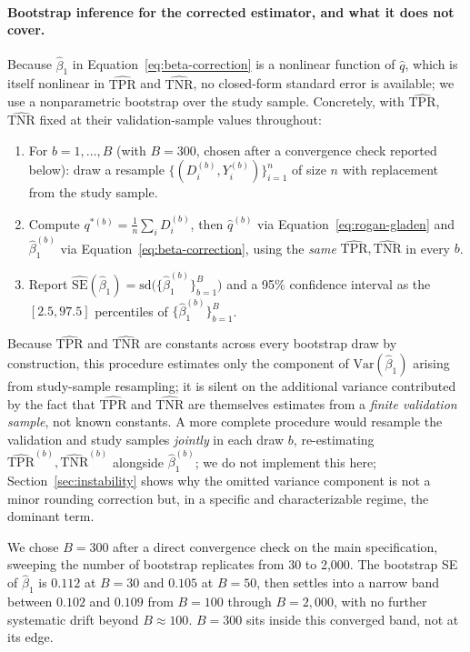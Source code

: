 \documentclass[12pt]{article}
\begin{document}
\paragraph{Bootstrap inference for the corrected estimator, and what it does not cover.} Because $\hat\beta_1$ in Equation~\ref{eq:beta-correction} is a nonlinear function of $\hat q$, which is itself nonlinear in $\widehat{\text{TPR}}$ and $\widehat{\text{TNR}}$, no closed-form standard error is available; we use a nonparametric bootstrap over the study sample. Concretely, with $\widehat{\text{TPR}}$, $\widehat{\text{TNR}}$ fixed at their validation-sample values throughout:
\begin{enumerate}
\item For $b = 1,\dots,B$ (with $B=300$, chosen after a convergence check reported below): draw a resample $\{(D_i^{(b)}, Y_i^{(b)})\}_{i=1}^{n}$ of size $n$ with replacement from the study sample.
\item Compute $q^{*(b)} = \frac{1}{n}\sum_i D_i^{(b)}$, then $\hat q^{(b)}$ via Equation~\ref{eq:rogan-gladen} and $\hat\beta_1^{(b)}$ via Equation~\ref{eq:beta-correction}, using the \emph{same} $\widehat{\text{TPR}}, \widehat{\text{TNR}}$ in every $b$.
\item Report $\widehat{\mathrm{SE}}(\hat\beta_1) = \mathrm{sd}\big(\{\hat\beta_1^{(b)}\}_{b=1}^{B}\big)$ and a 95\% confidence interval as the $[2.5, 97.5]$ percentiles of $\{\hat\beta_1^{(b)}\}_{b=1}^{B}$.
\end{enumerate}
Because $\widehat{\text{TPR}}$ and $\widehat{\text{TNR}}$ are constants across every bootstrap draw by construction, this procedure estimates only the component of $\mathrm{Var}(\hat\beta_1)$ arising from study-sample resampling; it is silent on the additional variance contributed by the fact that $\widehat{\text{TPR}}$ and $\widehat{\text{TNR}}$ are themselves estimates from a \emph{finite validation sample}, not known constants. A more complete procedure would resample the validation and study samples \emph{jointly} in each draw $b$, re-estimating $\widehat{\text{TPR}}^{(b)}, \widehat{\text{TNR}}^{(b)}$ alongside $\hat\beta_1^{(b)}$; we do not implement this here; Section~\ref{sec:instability} shows why the omitted variance component is not a minor rounding correction but, in a specific and characterizable regime, the dominant term.

We chose $B=300$ after a direct convergence check on the main specification, sweeping the number of bootstrap replicates from 30 to 2,000. The bootstrap SE of $\hat\beta_1$ is $0.112$ at $B=30$ and $0.105$ at $B=50$, then settles into a narrow band between $0.102$ and $0.109$ from $B=100$ through $B=2{,}000$, with no further systematic drift beyond $B\approx100$. $B=300$ sits inside this converged band, not at its edge.
\end{document}
